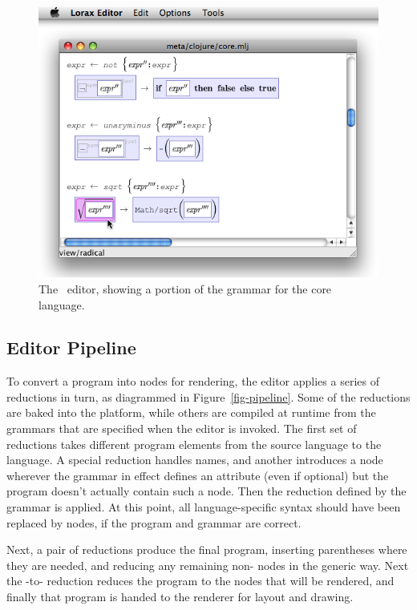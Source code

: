\begin{figure}[t]
	\centering
  
	\includegraphics[scale=0.60]{src/image/editor.png}
  
	\caption{The \Meta\ editor, showing a portion of the grammar for the core language.}
	\label{fig-editor}
\end{figure}


\subsection{Editor Pipeline}
To convert a program into  nodes for rendering, the editor applies a series of reductions in turn, as diagrammed in Figure~\ref{fig-pipeline}. Some of the reductions are baked into the platform, while others are compiled at runtime from the grammars that are specified when the editor is invoked. The first set of reductions takes different program elements from the source language to the  language. A special reduction handles names, and another introduces a  node wherever the grammar in effect defines an attribute (even if optional) but the program doesn't actually contain such a node. Then the reduction defined by the grammar is applied. At this point, all language-specific syntax should have been replaced by  nodes, if the program and grammar are correct.

Next, a pair of reductions produce the final  program, inserting parentheses where they are needed, and reducing any remaining non- nodes in the generic way. Next the -to- reduction reduces the program to the  nodes that will be rendered, and finally that program is handed to the renderer for layout and drawing.

